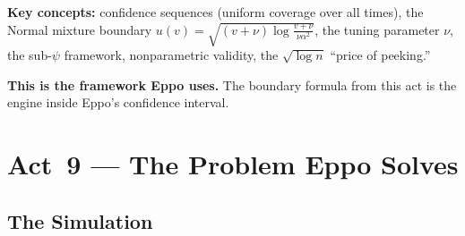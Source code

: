 \documentclass[12pt, a4paper]{article}
\begin{document}
\begin{keytakeaway}
\textbf{Key concepts:} confidence sequences (uniform coverage over all times),
the Normal mixture boundary $u(v) = \sqrt{(v+\nu)\log\frac{v+\nu}{\nu\alpha^2}}$,
the tuning parameter $\nu$, the sub-$\psi$ framework, nonparametric validity,
the $\sqrt{\log n}$ ``price of peeking.''

\textbf{This is the framework Eppo uses.}  The boundary formula from this act
is the engine inside Eppo's confidence interval.
\end{keytakeaway}


\newpage
\section{Act~9 --- The Problem Eppo Solves}

\subsection{The Simulation}
\end{document}
